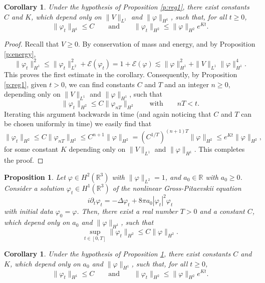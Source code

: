 \documentclass[11pt,a4paper]{scrartcl}
\newtheorem{cor}[thm]{Corollary}
\newtheorem{prp}[thm]{Proposition}
\newcommand{\R}{\mathds{R}}
\begin{document}
\begin{cor} \label{c:reg1}
  Under the hypothesis of Proposition \ref{p:reg1}, there exist constants $C$
  and $K$, which depend only on $\| V \|_{L^1}$ and $\| \varphi \|_{H^1}$,
  such that, for all $t \ge 0$,
  \[
    \| \varphi_t \|_{H^1} \le C \qquad \text{and} \qquad \| \varphi_t \|_{H^2}
    \le \| \varphi \|_{H^2} e^{Kt}.
  \]
\end{cor}


\begin{proof}
  Recall that $V \ge 0$. By conservation of mass and energy, and by
  Proposition \ref{p:energy},
  \[
    \| \varphi_t \|_{H^1}^2 \le \| \varphi_t \|_{L^2}^2 +
    \mathcal{E}(\varphi_t) = 1 + \mathcal{E}(\varphi) \apprle \| \varphi
    \|_{H^1}^2 + \| V \|_{L^1} \| \varphi \|_{H^1}^4.
  \]
  This proves the first estimate in the corollary. Consequently, by
  Proposition \ref{p:reg1}, given $t > 0$, we can find constants $C$ and $T$
  and an integer $n \ge 0$, depending only on $\| V \|_{L^1}$ and $\| \varphi
  \|_{H^1}$, such that
  \[
    \| \varphi_t \|_{H^2} \le C \| \varphi_{nT} \|_{H^2} \qquad \text{with}
    \qquad nT < t.
  \]
  Iterating this argument backwards in time (and again noticing that $C$ and
  $T$ can be chosen uniformly in time) we easily find that
  \[
    \| \varphi_t \|_{H^2} \le C \| \varphi_{nT} \|_{H^2} \le C^{n+1} \|
    \varphi \|_{H^2} = (C^{1/T})^{(n+1)T} \| \varphi \|_{H^2} \le e^{Kt} \|
    \varphi \|_{H^2},
  \]
  for some constant $K$ depending only on $\| V \|_{L^1}$ and $\| \varphi
  \|_{H^1}$. This completes the proof.
\end{proof}


\begin{prp} \label{p:reg2}
  Let $\varphi \in H^2(\R^3)$ with $\| \varphi \|_{L^2} = 1$, and $a_0 \in \R$
  with $a_0 \ge 0$. Consider a solution $\varphi_t \in H^1(\R^3)$ of the
  nonlinear Gross-Pitaevskii equation
  \[
    i \partial_t \varphi_t = - \Delta \varphi_t + 8 \pi a_0 |\varphi_t|^2
    \varphi_t
  \]
  with initial data $\varphi_0 = \varphi$. Then, there exist a real number $T
  > 0$ and a constant $C$, which depend only on $a_0$ and $\| \varphi
  \|_{H^1}$, such that
  \[
    \sup_{t \in [0,T]} \| \varphi_t \|_{H^2} \le C \| \varphi \|_{H^2}.
  \]
\end{prp}


\begin{cor} \label{c:reg2}
  Under the hypothesis of Proposition \ref{p:reg2}, there exist constants $C$
  and $K$, which depend only on $a_0$ and $\| \varphi \|_{H^1}$, such that,
  for all $t \ge 0$,
  \[
    \| \varphi_t \|_{H^1} \le C \qquad \text{and} \qquad \| \varphi_t \|_{H^2}
    \le \| \varphi \|_{H^2} e^{Kt}.
  \]
\end{cor}
\end{document}
